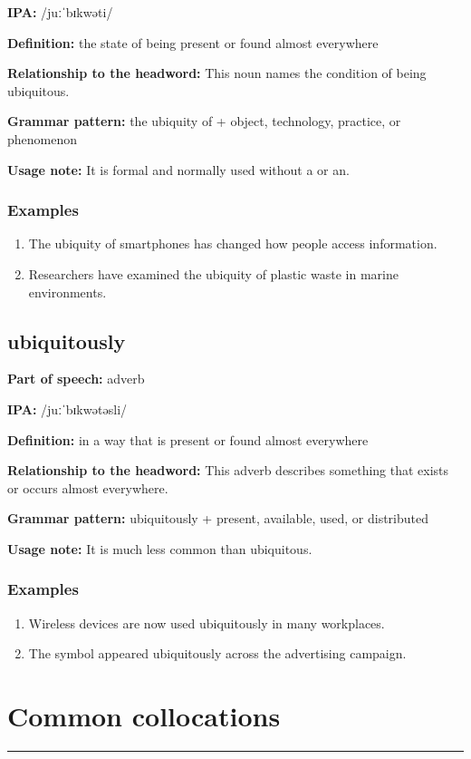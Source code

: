 \documentclass[11pt]{article}
\newcommand{\sectionrule}{\par\vspace{-0.5em}\noindent\textcolor{Accent}{\rule{\linewidth}{0.6pt}}\par}
\begin{document}
\textbf{IPA:} /juːˈbɪkwəti/

\textbf{Definition:} the state of being present or found almost everywhere

\textbf{Relationship to the headword:} This noun names the condition of being ubiquitous.

\textbf{Grammar pattern:} the ubiquity of + object, technology, practice, or phenomenon

\textbf{Usage note:} It is formal and normally used without a or an.

\subsubsection{Examples}
\begin{enumerate}
  \item The ubiquity of smartphones has changed how people access information.
  \item Researchers have examined the ubiquity of plastic waste in marine environments.
\end{enumerate}

\subsection{ubiquitously}
\textbf{Part of speech:} adverb

\textbf{IPA:} /juːˈbɪkwətəsli/

\textbf{Definition:} in a way that is present or found almost everywhere

\textbf{Relationship to the headword:} This adverb describes something that exists or occurs almost everywhere.

\textbf{Grammar pattern:} ubiquitously + present, available, used, or distributed

\textbf{Usage note:} It is much less common than ubiquitous.

\subsubsection{Examples}
\begin{enumerate}
  \item Wireless devices are now used ubiquitously in many workplaces.
  \item The symbol appeared ubiquitously across the advertising campaign.
\end{enumerate}

\section{Common collocations}
\sectionrule
\end{document}
